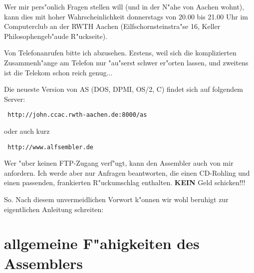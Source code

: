 \documentclass[12pt,a4paper,twoside]{report}
\newcommand{\bb}[1]{{\bf #1}}
\begin{document}
Wer mir pers"onlich Fragen stellen will (und in der N"ahe von Aachen
wohnt), kann dies mit hoher Wahrscheinlichkeit donnerstags von 20.00
bis 21.00 Uhr im Computerclub an der RWTH Aachen (Eilfschornsteinstra"se 16,
Keller Philosophengeb"aude R"uckseite).
\par
Von Telefonanrufen bitte ich abzusehen.  Erstens, weil sich die
komplizierten Zusammenh"ange am Telefon nur "au"serst schwer er"orten
lassen, und zweitens ist die Telekom schon reich genug...
\par
Die neueste Version von AS (DOS, DPMI, OS/2, C) findet sich auf folgendem
Server:
\begin{verbatim}
 http://john.ccac.rwth-aachen.de:8000/as
\end{verbatim}
oder auch kurz
\begin{verbatim}
 http://www.alfsembler.de
\end{verbatim}
\par
Wer "uber keinen FTP-Zugang verf"ugt, kann den Assembler auch von mir
anfordern.  Ich werde aber nur Anfragen beantworten, die einen CD-Rohling
und einen passenden, frankierten R"uckumschlag enthalten.  \bb{KEIN} Geld
schicken!!!
\par
So. Nach diesem unvermeidlichen Vorwort k"onnen wir wohl beruhigt
zur eigentlichen Anleitung schreiten:


\section{allgemeine F"ahigkeiten des Assemblers}
\end{document}
